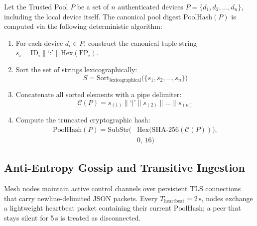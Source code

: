 \documentclass[conference,a4paper]{IEEEtran}
\begin{document}
Let the Trusted Pool $P$ be a set of $n$ authenticated devices $P = \{d_1, d_2, \dots, d_n\}$, including the local device itself. The canonical pool digest $\text{PoolHash}(P)$ is computed via the following deterministic algorithm:
\begin{enumerate}
    \item For each device $d_i \in P$, construct the canonical tuple string $s_i = \text{ID}_i \parallel \text{`:'} \parallel \text{Hex}(\text{FP}_i)$.
    \item Sort the set of strings lexicographically:
    \begin{equation}
        S = \text{Sort}_{\text{lexicographical}}\big(\{s_1, s_2, \dots, s_n\}\big)
    \end{equation}
    \item Concatenate all sorted elements with a pipe delimiter:
    \begin{equation}
        \mathcal{C}(P) = s_{(1)} \parallel \text{`}{\vert}\text{'} \parallel s_{(2)} \parallel \dots \parallel s_{(n)}
    \end{equation}
    \item Compute the truncated cryptographic hash:
    \begin{equation}
    \begin{split}
        \text{PoolHash}(P) = \text{SubStr}\Big(&\text{Hex}\big(\text{SHA-256}(\mathcal{C}(P))\big), \\
        &0,\, 16\Big)
    \end{split}
    \end{equation}
\end{enumerate}

\subsection{Anti-Entropy Gossip and Transitive Ingestion}
Mesh nodes maintain active control channels over persistent TLS connections that carry newline-delimited JSON packets. Every $T_{\text{heartbeat}} = 2\,\text{s}$, nodes exchange a lightweight heartbeat packet containing their current $\text{PoolHash}$; a peer that stays silent for 5\,s is treated as disconnected.
\end{document}
